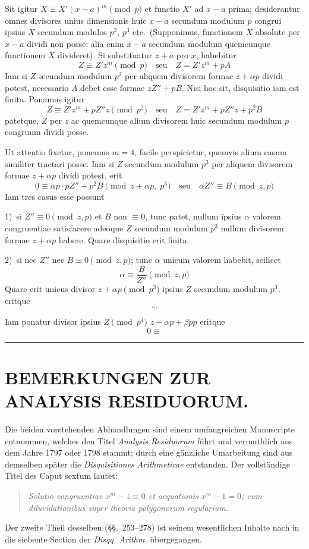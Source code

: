 \documentclass[12pt]{article}
\begin{document}
Sit igitur $X\equiv X'(x-a)^m\pmod{p}$ et functio $X'$ ad $x-a$ prima; desiderantur omnes divisores unius dimensionis huic $x-a$ secundum modulum $p$ congrui ipsius $X$ secundum modulos $p^2$, $p^3$ etc.~(Supponimus, functionem $X$ absolute per $x-a$ dividi non posse; alia enim $x-a$ secundum modulum quemcunque functionem $X$ divideret). Si substituatur $z+a$ pro $x$, habebitur
\[
Z\equiv Z'z^m\pmod{p} \quad \text{seu} \quad Z=Z'z^m+pA
\]
Iam si $Z$ secundum modulum $p^2$ per aliquem divisorem formae $z+\alpha p$ dividi potest, necessario $A$ debet esse formae $zZ''+pB$. Nisi hoc sit, disquisitio iam est finita. Ponamus igitur
\[
Z\equiv Z'z^m+pZ''z\pmod{p^2} \quad \text{seu} \quad Z=Z'z^m+pZ''z+p^2B
\]
patetque, $Z$ per $z$ ac quemcunque alium divisorem huic secundum modulum $p$ congruum dividi posse.

Ut attentio fixetur, ponemus $m=4$, facile perspicietur, quemvis alium casum similiter tractari posse. Iam si $Z$ secundum modulum $p^3$ per aliquem divisorem formae $z+\alpha p$ dividi potest, erit
\[
0\equiv \alpha p\cdot pZ''+p^2B \pmod{z+\alpha p,\; p^3} \quad \text{seu} \quad \alpha Z''\equiv B \pmod{z,p}
\]
Iam tres casus esse possunt

1)~si $Z''\equiv 0\pmod{z,p}$ et $B$ non $\equiv 0$, tunc patet, nullum ipsius $\alpha$ valorem congruentiae satisfacere adeoque $Z$ secundum modulum $p^3$ nullum divisorem formae $z+\alpha p$ habere. Quare disquisitio erit finita.

2)~si nec $Z''$ nec $B\equiv 0\pmod{z,p}$; tunc $\alpha$ unicum valorem habebit, scilicet
\[
\alpha\equiv \frac{B}{Z''} \pmod{z,p}
\]
Quare erit unicus divisor $z+\alpha p\pmod{p^3}$ ipsius $Z$ secundum modulum $p^3$, eritque
\[
\ldots
\]

Iam ponatur divisor ipsius $Z\pmod{p^4}$ $z+\alpha p+\beta pp$ eritque
\[
0\equiv
\]

\begin{center}\rule{0.45\textwidth}{0.4pt}\end{center}




\section*{BEMERKUNGEN ZUR ANALYSIS RESIDUORUM.}

Die beiden vorstehenden Abhandlungen sind einem umfangreichen Manuscripte entnommen, welches den Titel \textit{Analysis Residuorum} führt und vermuthlich aus dem Jahre 1797 oder 1798 stammt; durch eine gänzliche Umarbeitung sind aus demselben später die \textit{Disquisitiones Arithmeticae} entstanden. Der vollständige Titel des Caput sextum lautet:
\begin{quote}
\textit{Solutio congruentiae $x^m-1\equiv 0$ et aequationis $x^m-1=0$; cum dilucidationibus super theoria polygonorum regularium.}
\end{quote}
Der zweite Theil desselben (\S\S.~253--278) ist seinem wesentlichen Inhalte nach in die siebente Section der \textit{Disqq. Arithm.} übergegangen.
\end{document}
